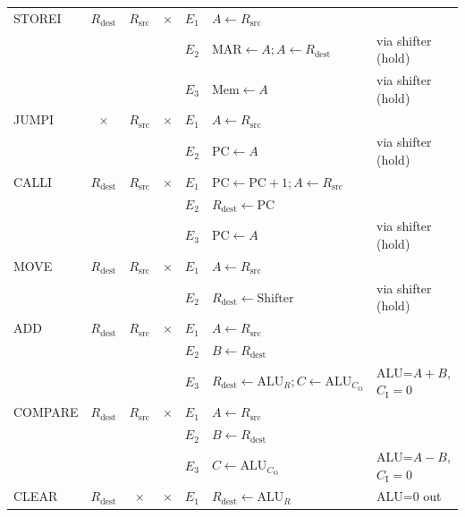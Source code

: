 \documentclass[a4paper, 12pt]{article}
\begin{document}
\begin{center}
\begin{tabular}{l||c|c|c||c|l|l}
                    \hline
                    STOREI & $R_\text{dest}$ & $R_\text{src}$ & $\times$ & $E_1$ & $A \leftarrow R_\text{src}$ & \\
                    & & & & $E_2$ & $\text{MAR} \leftarrow A; A \leftarrow R_\text{dest}$ & via shifter (hold) \\
                    & & & & $E_3$ & $\text{Mem} \leftarrow A$ & via shifter (hold) \\
                    \hline
                    JUMPI & $\times$ & $R_\text{src}$ & $\times$ & $E_1$ & $A \leftarrow R_\text{src}$ & \\
                    & & & & $E_2$ & $\text{PC} \leftarrow A$ & via shifter (hold) \\
                    \hline
                    CALLI & $R_\text{dest}$ & $R_\text{src}$ & $\times$ & $E_1$ & $\text{PC} \leftarrow \text{PC} + 1; A \leftarrow R_\text{src}$ & \\
                    & & & & $E_2$ & $R_\text{dest} \leftarrow \text{PC}$ & \\
                    & & & & $E_3$ & $\text{PC} \leftarrow A$ & via shifter (hold) \\
                    \hline
                    MOVE & $R_\text{dest}$ & $R_\text{src}$ & $\times$ & $E_1$ & $A \leftarrow R_\text{src}$ & \\
                    & & & & $E_2$ & $R_\text{dest} \leftarrow \text{Shifter}$ & via shifter (hold) \\
                    \hline
                    ADD & $R_\text{dest}$ & $R_\text{src}$ & $\times$ & $E_1$ & $A \leftarrow R_\text{src}$ & \\
                    & & & & $E_2$ & $B \leftarrow R_\text{dest}$ & \\
                    & & & & $E_3$ & $R_\text{dest} \leftarrow \text{ALU}_R; C \leftarrow \text{ALU}_{C_\text{O}}$ & ALU=$A+B$, $C_\text{I} = 0$\\
                    \hline
                    COMPARE & $R_\text{dest}$ & $R_\text{src}$ & $\times$ & $E_1$ & $A \leftarrow R_\text{src}$ & \\
                    & & & & $E_2$ & $B \leftarrow R_\text{dest}$ & \\
                    & & & & $E_3$ & $C \leftarrow \text{ALU}_{C_\text{O}}$ & ALU=$A-B$, $C_\text{I} = 0$ \\
                    \hline
                    CLEAR & $R_\text{dest}$ & $\times$ & $\times$ & $E_1$ & $R_\text{dest} \leftarrow \text{ALU}_R$ & ALU=0 out \\

\end{tabular}
\end{center}
\end{document}
